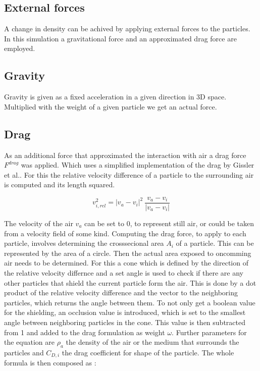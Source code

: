 \documentclass[intern]{cgMA}
\begin{document}
    \subsection{External forces}
    A change in density can be achived by applying external forces to the particles. In this simulation a gravitational force and an approximated drag force are employed.
    \subsection{Gravity}
    Gravity is given as a fixed acceleration in a given direction in 3D space. Multiplied with the weight of a given particle we get an actual force.
    \subsection{Drag}
    As an additional force that approximated the interaction with air a drag force $F^{drag}$ was applied. Which uses a simplified implementation of the drag by Gissler et al.. For this the relative velocity difference of a particle to the surrounding air is computed and its length squared. \cite{10.1016/j.cag.2017.09.002}

    \begin{equation}
        \label{eq:v_rel}
        v^2_{i,rel} = |v_a - v_i|^2\ \frac{v_a - v_i}{|v_a - v_i|}
    \end{equation}

    The velocity of the air $v_a$ can be set to 0, to represent still air, or could be taken from a velocity field of some kind. Computing the drag force, to apply to each particle, involves determining the crosssecional area $A_i$ of a particle. This can be represented by the area of a circle. Then the actual area exposed to oncomming air needs to be determined. For this a cone which is defined by the direction of the relative velocity differnce and a set angle is used to check if there are any other particles that shield the current particle form the air. This is done by a dot product of the relative velocity difference and the vector to the neighboring particles, which returns the angle between them. To not only get a boolean value for the shielding, an occlusion value is introduced, which is set to the smallest angle between neighboring particles in the cone. This value is then subtracted from 1 and added to the drag formulation as weight $\omega$. Further parameters for the equation are $\rho_a$ the density of the air or the medium that surrounds the particles and $C_{D,i}$ the drag coefficient for shape of the particle. \cite{10.1016/j.cag.2017.09.002} The whole formula is then composed as : 
\end{document}

